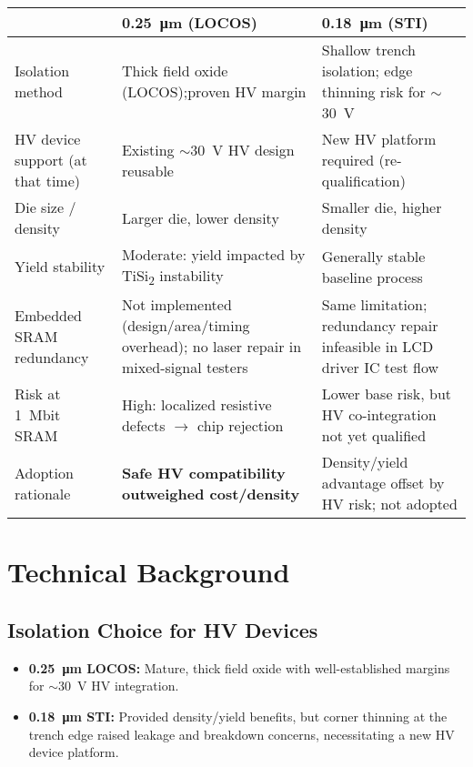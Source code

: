 \documentclass[conference]{IEEEtran}
\begin{document}
\begin{table*}[t]
  \centering
  \caption{Comparison of \SI{0.25}{\micro\meter} LOCOS and \SI{0.18}{\micro\meter} STI nodes for LCD driver ICs}
  \label{tab:locos_sti}
  \vspace{2pt}
  \begin{tabular}{@{}p{4.2cm}p{5.9cm}p{5.9cm}@{}}
    \toprule
    & \textbf{\SI{0.25}{\micro\meter} (LOCOS)} & \textbf{\SI{0.18}{\micro\meter} (STI)} \\
    \midrule
    Isolation method &
      Thick field oxide (LOCOS);\newline proven HV margin &
      Shallow trench isolation; \newline edge thinning risk for $\sim$\SI{30}{\volt} \\
    HV device support (at that time) &
      Existing $\sim$\SI{30}{\volt} HV design reusable &
      New HV platform required (re-qualification) \\
    Die size / density &
      Larger die, lower density &
      Smaller die, higher density \\
    Yield stability &
      Moderate: yield impacted by TiSi\textsubscript{2} instability &
      Generally stable baseline process \\
    Embedded SRAM redundancy &
      Not implemented (design/area/timing overhead); \newline no laser repair in mixed-signal testers &
      Same limitation; redundancy repair infeasible in LCD driver IC test flow \\
    Risk at \SI{1}{Mbit} SRAM &
      High: localized resistive defects $\rightarrow$ chip rejection &
      Lower base risk, but HV co-integration not yet qualified \\
    Adoption rationale &
      \textbf{Safe HV compatibility outweighed cost/density} &
      Density/yield advantage offset by HV risk; not adopted \\
    \bottomrule
  \end{tabular}
\end{table*}

\section{Technical Background}
\subsection{Isolation Choice for HV Devices}
\begin{itemize}
    \item \textbf{\SI{0.25}{\micro\meter} LOCOS:} Mature, thick field oxide with well-established margins for $\sim$\SI{30}{\volt} HV integration.
    \item \textbf{\SI{0.18}{\micro\meter} STI:} Provided density/yield benefits, but corner thinning at the trench edge raised leakage and breakdown concerns, necessitating a new HV device platform.
\end{itemize}
\end{document}
